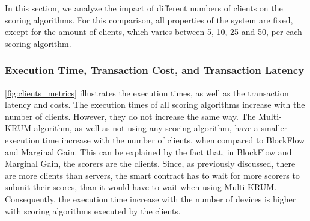 In this section, we analyze the impact of different numbers of clients on the scoring algorithms. For this comparison, all properties of the system are fixed, except for the amount of clients, which varies between 5, 10, 25 and 50, per each scoring algorithm.

\subsubsection{Execution Time, Transaction Cost, and Transaction Latency}

\autoref{fig:clients_metrics} illustrates the execution times, as well as the transaction latency and costs. The execution times of all scoring algorithms increase with the number of clients. However, they do not increase the same way. The Multi-KRUM algorithm, as well as not using any scoring algorithm, have a smaller execution time increase with the number of clients, when compared to BlockFlow and Marginal Gain. This can be explained by the fact that, in BlockFlow and Marginal Gain, the scorers are the clients. Since, as previously discussed, there are more clients than servers, the smart contract has to wait for more scorers to submit their scores, than it would have to wait when using Multi-KRUM. Consequently, the execution time increase with the number of devices is higher with scoring algorithms executed by the clients.

